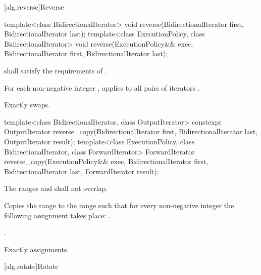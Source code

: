 [alg.reverse]{Reverse}

%
\begin{itemdecl}
template<class BidirectionalIterator>
  void reverse(BidirectionalIterator first, BidirectionalIterator last);
template<class ExecutionPolicy, class BidirectionalIterator>
  void reverse(ExecutionPolicy&& exec,
               BidirectionalIterator first, BidirectionalIterator last);
\end{itemdecl}

\begin{itemdescr}
\pnum
\requires
{} shall satisfy the requirements of
.

\pnum
\effects
For each non-negative integer
,
applies
to all pairs of iterators
.

\pnum
\complexity
Exactly
swaps.
\end{itemdescr}

%
\begin{itemdecl}
template<class BidirectionalIterator, class OutputIterator>
  constexpr OutputIterator
    reverse_copy(BidirectionalIterator first, BidirectionalIterator last,
                 OutputIterator result);
template<class ExecutionPolicy, class BidirectionalIterator, class ForwardIterator>
  ForwardIterator
    reverse_copy(ExecutionPolicy&& exec,
                 BidirectionalIterator first, BidirectionalIterator last,
                 ForwardIterator result);
\end{itemdecl}

\begin{itemdescr}
\pnum
\requires
The ranges
and
shall not overlap.

\pnum
\effects
Copies the range
to the range
such that
for every non-negative integer
the following assignment takes place:
.

\pnum
\returns
{}.

\pnum
\complexity
Exactly
assignments.
\end{itemdescr}

[alg.rotate]{Rotate}

